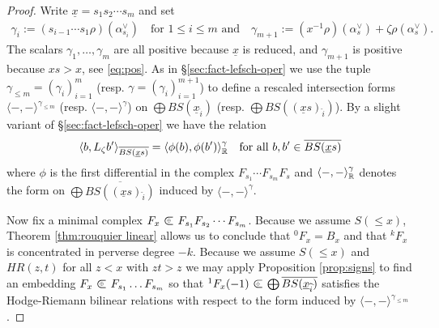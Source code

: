 \documentclass[11pt]{amsart}
\numberwithin{equation}{section}
\def\a{\alpha}
\def\g{\gamma}
\def\z{\zeta}
\def\ov{\overline}
\def\un{\underline}
\def\summand{
\mathbin{\tikz [baseline=-3pt]
{
\clip (-0.2,-0.15) rectangle (0.2,0.15);
\node[scale=1.2] at (0,0) {$\subset$}; \node[scale=0.5] at
  (0,0) {$\oplus$}; }}
}
\theoremstyle{definition}
\theoremstyle{remark}
\begin{document}
{\begin{proof}
  Write $\un{x} = s_1s_2 \cdots s_m$ and set 
\begin{gather*}
\g_i := (s_{i-1} \cdots s_1 \rho)(\a_{s_i}^\vee) \quad
\text{for $1 \le i \le m$ and} \quad 
\g_{m+1} := ( x^{-1} \rho)(\a_s^\vee) + \z \rho (\a_s^\vee).
\end{gather*}
The scalars $\g_1, \dots, \g_m$ are all positive because $\un{x}$ is
reduced, and $\g_{m+1}$ is positive because $xs > x$, see
\eqref{eq:pos}.
As in \S\ref{sec:fact-lefsch-oper} we use the
  tuple $\gamma_{\le m} = (\gamma_i)_{i=1}^m$ (resp. 
  $\gamma = (\gamma_i)_{i=1}^{m+1}$) to
define a rescaled intersection forms $\langle -, - \rangle^{\g_{\le
    m}}$ (resp. $\langle -, - \rangle^\g$) on $\bigoplus
BS(\un{x}_{\hat{i}})$ (resp. $\bigoplus
BS((\un{x}s)_{\widehat{i}})$). 
By a slight variant of \S\ref{sec:fact-lefsch-oper} we have the relation
\begin{equation} \label{eq:phiL}
\langle b, L_\z b'
\rangle_{\ov{BS(\un{x}s)}} = \langle \phi(b), \phi(b') \rangle^\g_\RM \quad \text{for all $b, b' \in \ov{BS(\un{x}s)}$}
\end{equation}
where $\phi$ is the first differential in the complex $F_{s_1} \cdots
F_{s_m}F_s$ and $\langle -, - \rangle^\g_\RM$ denotes the form
on $\bigoplus \overline{BS((\un{x}s)_{\widehat{i}})}$ induced by
$\langle -, - \rangle^\g$.

Now fix a minimal complex $F_x \summand F_{s_1}F_{s_2} \cdots
F_{s_m}$. Because we assume $S(\le\!x)$, Theorem \ref{thm:rouquier
  linear} allows us to conclude that ${}^0F_x = B_x$ and that ${}^kF_x$ is concentrated
in perverse degree $-k$. Because we assume $S(\le\!x)$
  and $HR(z,t)$ for all
$z < x$ with $zt > z$ we may apply Proposition 
\ref{prop:signs} to find an embedding $F_x
\summand F_{s_1} \dots F_{s_m}$ so that ${}^1F_x(-1) \summand \bigoplus
\overline{BS(\un{x}_{\widehat{i}})}$ satisfies the Hodge-Riemann
bilinear relations with respect to the form induced by $\langle -, - \rangle^{\g_{\le
    m}}$.



\end{proof}}
\end{document}
